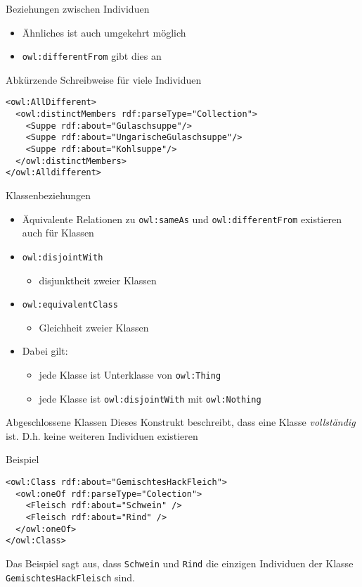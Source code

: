 \documentclass{beamer}
\begin{document}
\begin{frame}[fragile]{Beziehungen zwischen Individuen}
\begin{itemize}
\item Ähnliches ist auch umgekehrt möglich
\item \texttt{owl:differentFrom} gibt dies an
\end{itemize}
\begin{block}{Abkürzende Schreibweise für viele Individuen}
\begin{lstlisting}[lang="xml"]
<owl:AllDifferent>
  <owl:distinctMembers rdf:parseType="Collection">
    <Suppe rdf:about="Gulaschsuppe"/>
    <Suppe rdf:about="UngarischeGulaschsuppe"/>
    <Suppe rdf:about="Kohlsuppe"/>
  </owl:distinctMembers>
</owl:Alldifferent>
\end{lstlisting}
\end{block}

\end{frame}
%
\begin{frame}[fragile]{Klassenbeziehungen}
\begin{itemize}
\item Äquivalente Relationen zu \texttt{owl:sameAs} und \texttt{owl:differentFrom}
existieren auch für Klassen
\item \texttt{owl:disjointWith}
\begin{itemize}
 \item disjunktheit zweier Klassen
\end{itemize}
\item \texttt{owl:equivalentClass}
\begin{itemize}
 \item Gleichheit zweier Klassen
\end{itemize}
\item Dabei gilt:
\begin{itemize}
\item jede Klasse ist Unterklasse von \texttt{owl:Thing}
\item jede Klasse ist \texttt{owl:disjointWith} mit
\texttt{owl:Nothing}

\end{itemize}
\end{itemize}
\end{frame}
%
\begin{frame}[fragile]{Abgeschlossene Klassen}
Dieses Konstrukt beschreibt, dass eine Klasse \emph{vollständig} ist. D.h. keine weiteren Individuen existieren		
\begin{block}{Beispiel}
\begin{lstlisting}[lang="xml"]
<owl:Class rdf:about="GemischtesHackFleich">
  <owl:oneOf rdf:parseType="Colection">
    <Fleisch rdf:about="Schwein" />
    <Fleisch rdf:about="Rind" />
  </owl:oneOf>
</owl:Class>
\end{lstlisting}
\end{block}
Das Beispiel sagt aus, dass \texttt{Schwein} und \texttt{Rind} die einzigen Individuen der Klasse \texttt{GemischtesHackFleisch} sind.
\end{frame}
\end{document}
